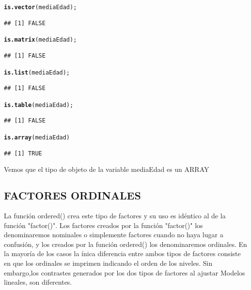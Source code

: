 \documentclass[12pt,letterpaper]{article}\usepackage[]{graphicx}\usepackage[]{color}
\makeatletter
\newcommand{\hlstd}[1]{\textcolor[rgb]{0.345,0.345,0.345}{#1}}%
\newcommand{\hlkwd}[1]{\textcolor[rgb]{0.737,0.353,0.396}{\textbf{#1}}}%
\newenvironment{kframe}{%
 \def\at@end@of@kframe{}%
 \ifinner\ifhmode%
  \def\at@end@of@kframe{\end{minipage}}%
  \begin{minipage}{\columnwidth}%
 \fi\fi%
 \def\FrameCommand##1{\hskip\@totalleftmargin \hskip-\fboxsep
 \colorbox{shadecolor}{##1}\hskip-\fboxsep
     \hskip-\linewidth \hskip-\@totalleftmargin \hskip\columnwidth}%
 \MakeFramed {\advance\hsize-\width
   \@totalleftmargin\z@ \linewidth\hsize
   \@setminipage}}%
 {\par\unskip\endMakeFramed%
 \at@end@of@kframe}
\newenvironment{knitrout}{}{} %
\makeatother
\begin{document}
\begin{knitrout}
\begin{kframe}
\begin{alltt}
\hlkwd{is.vector}\hlstd{(mediaEdad);}
\end{alltt}
\begin{verbatim}
## [1] FALSE
\end{verbatim}
\begin{alltt}
\hlkwd{is.matrix}\hlstd{(mediaEdad);}
\end{alltt}
\begin{verbatim}
## [1] FALSE
\end{verbatim}
\begin{alltt}
\hlkwd{is.list}\hlstd{(mediaEdad);}
\end{alltt}
\begin{verbatim}
## [1] FALSE
\end{verbatim}
\begin{alltt}
\hlkwd{is.table}\hlstd{(mediaEdad);}
\end{alltt}
\begin{verbatim}
## [1] FALSE
\end{verbatim}
\begin{alltt}
\hlkwd{is.array}\hlstd{(mediaEdad)}
\end{alltt}
\begin{verbatim}
## [1] TRUE
\end{verbatim}
\end{kframe}
\end{knitrout}
Vemos que el tipo de objeto de la variable mediaEdad es un ARRAY
\subsection{FACTORES ORDINALES}
 La funci\'on ordered() crea este tipo de factores y su uso es id\'entico al de la funci\'on "factor()". Los factores creados por la funci\'on "factor()"  los denominaremos nominales o simplemente factores cuando no haya lugar a confusi\'on, y los creados por la funci\'on ordered() los denominaremos ordinales. En la mayor\'ia de los casos la \'inica diferencia entre ambos tipos de factores consiste en que los ordinales se imprimen indicando el orden de los niveles. Sin embargo,los contrastes generados por los dos tipos de factores al ajustar Modelos lineales, son diferentes.
\end{document}
